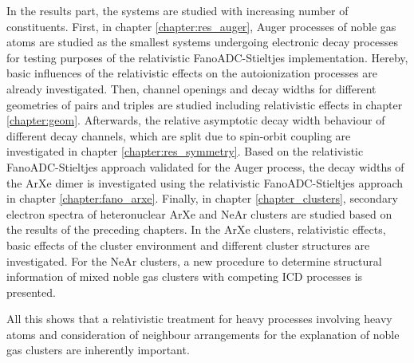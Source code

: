 In the results part, the systems are studied with increasing number of constituents.
First, in chapter \ref{chapter:res_auger}, Auger processes of noble gas
atoms are studied as the smallest systems undergoing electronic decay
processes for testing purposes
of the relativistic FanoADC-Stieltjes implementation. Hereby, basic influences
of the relativistic effects on the autoionization processes are already
investigated.
Then, channel openings and decay widths for
different geometries of pairs and triples are studied including relativistic
effects in chapter \ref{chapter:geom}. Afterwards, the relative asymptotic
decay width behaviour
of different decay channels, which are split due to spin-orbit coupling are
investigated in chapter \ref{chapter:res_symmetry}.
Based on the relativistic FanoADC-Stieltjes approach validated for the
Auger process, the decay widths of the ArXe dimer is
investigated using the relativistic FanoADC-Stieltjes approach in chapter
\ref{chapter:fano_arxe}. Finally, in chapter \ref{chapter_clusters},
secondary electron
spectra of heteronuclear ArXe and NeAr clusters are studied based on the
results of the preceding chapters.
In the ArXe clusters, relativistic effects, basic effects of the cluster environment
and different cluster structures are investigated.
For the NeAr clusters, a new procedure to determine structural information of mixed
noble gas clusters with competing \ac{ICD} processes is presented.

All this shows that a relativistic treatment for heavy processes involving
heavy atoms and consideration of neighbour arrangements for the explanation
of noble gas clusters are inherently important.
